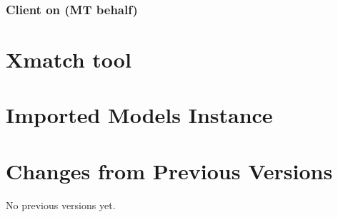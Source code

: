 \documentclass[11pt,a4paper]{ivoa}
\begin{document}
\subsubsection{Client on (MT behalf)}


\section{Xmatch tool }


\section{Imported Models Instance}

\section{Changes from Previous Versions}

No previous versions yet.



\end{document}
